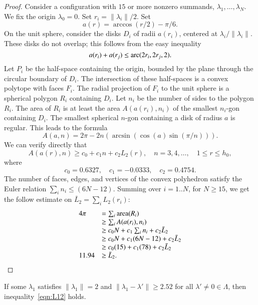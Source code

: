 \begin{proof} 
Consider a configuration with $15$ or more nonzero summands, $\lambda_1,\ldots,\lambda_N$. 
We fix the origin $\lambda_0=0$.  Set $r_i = \|\lambda_i\|/2$.  Set
$$
a(r) = \arccos(r/2) - \pi/6.
$$
On the unit sphere,  consider the disks $D_i$ of radii $a(r_i)$, centered at $\lambda_i/\|\lambda_i\|$.  These disks do not overlap; this follows from the easy inequality 
$$
a(r_i) + a(r_j) \le {\operatorname{arc}}(2r_i,2r_j,2).
$$
Let $P_i$ be the half-space containing the origin, bounded by the plane through the circular boundary of $D_i$.  The intersection of these half-spaces is a convex polytope with faces $F_i$.  The radial projection of $F_i$ to the unit sphere is a spherical polygon $R_i$ containing $D_i$.  Let $n_i$ be the number of sides to the polygon $R_i$.  The area of $R_i$ is at least the area $A(a(r_i),n_i)$ of the smallest $n_i$-gon containing $D_i$.  The smallest spherical $n$-gon containing a disk of radius $a$ is regular.  This leads to the formula
$$
A(a,n) = 2\pi - 2 n (\arcsin(\cos(a)\sin(\pi/n))).
$$
We can verify directly that
$$
A(a(r),n) \ge c_0 + c_1 n + c_2 L_2(r),\quad
n = 3,4,\ldots,\quad 1\le r\le h_0,
$$
where
$$c_0 = 0.6327,\quad c_1 = -0.0333,\quad c_2 = 0.4754.$$
The number of faces, edges, and vertices of the convex
polyhedron satisfy the Euler relation $\sum_i n_i \le (6N-12)$.
Summing over $i=1..N$, for $N\ge 15$, we get the follow
estimate on $\bar L_2 = \sum_i L_2(r_i)$:
$$
\begin{array}{lll}
4\pi &= \sum_i{\operatorname{area}}(R_i)\\
     &\ge \sum_i A(a(r_i),n_i) \\
     &\ge c_0 N +c_1\sum_i n_i + c_2 \bar L_2\\
     &\ge c_0 N +c_1 (6N-12) + c_2 \bar L_2\\
     &\ge c_0 (15) +c_1 (78) + c_2 \bar L_2\\
11.94 &\ge \bar L_2. 
\end{array}
$$
\end{proof} 


\begin{lemma}\label{lemma:D'}  
If some $\lambda_1$ satisfies $\|\lambda_1\|=2$ and
$\|\lambda_1-\lambda'\|\ge 2.52$ for all $\lambda'\ne0\in\Lambda$,
then  inequality~\ref{eqn:L12} holds.
\end{lemma}

